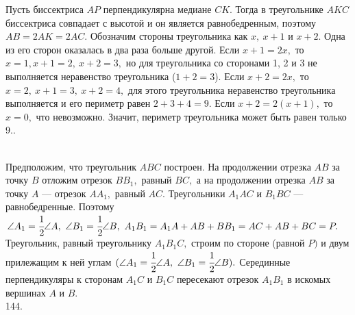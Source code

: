 \documentclass[12pt]{article}
\begin{document}
Пусть биссектриса $AP$ перпендикулярна медиане $CK.$ Тогда в треугольнике $AKC$ биссектриса совпадает с высотой и он является равнобедренным, поэтому $AB=2AK=2AC.$ Обозначим стороны треугольника как $x,\ x+1$ и $x+2.$ Одна из его сторон оказалась в два раза больше другой. Если $x+1=2x,$ то $x=1, x+1=2,\ x+2=3,$ но для треугольника со сторонами 1, 2 и 3 не выполняется неравенство треугольника ($1+2=3$). Если $x+2=2x,$ то $x=2,\ x+1=3,\ x+2=4,$ для этого треугольника неравенство треугольника выполняется и его периметр равен $2+3+4=9.$ Если $x+2=2(x+1),$ то $x=0,$ что невозможно. Значит, периметр треугольника может быть равен только 9.\newpage{}. \begin{figure}[ht!]
\end{figure}\\
Предположим, что треугольник $ABC$ построен. На продолжении отрезка $AB$ за точку $B$ отложим отрезок $BB_1,$ равный $BC,$ а на продолжении отрезка $AB$ за точку $A$ --- отрезок $AA_1,$ равный $AC.$ Треугольники $A_1AC$ и $B_1BC$ --- равнобедренные. Поэтому  $\angle A_1 = \cfrac{1}{2} \angle A,\  \angle B_1 = \cfrac{1}{2} \angle B,\ A_1B_1 = A_1A + AB + BB_1 = AC + AB + BC = P.$ Треугольник, равный треугольнику $A_1B_1C,$ строим по стороне (равной $P)$ и двум прилежащим к ней углам
$(\angle A_1 = \cfrac{1}{2}\angle A,\ \angle B_1 =\cfrac{1}{2}\angle B).$  Серединные перпендикуляры к сторонам $A_1C$ и $B_1C$ пересекают отрезок $A_1B_1$ в искомых вершинах $A$ и $B.$\\
144. \begin{figure}[ht!]
\end{figure}\\
\end{document}
